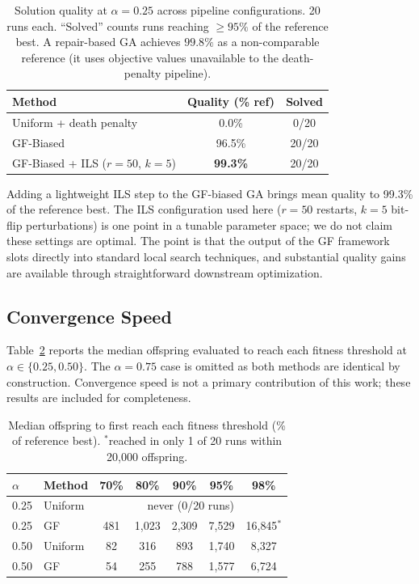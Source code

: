 \documentclass[twocolumn]{article}
\begin{document}
\begin{table}[H]
\centering
\begin{tabular}{p{4.0cm}cc}
\toprule
Method & Quality (\% ref) & Solved \\
\midrule
Uniform + death penalty & 0.0\% & 0/20 \\
GF-Biased & 96.5\% & 20/20 \\
GF-Biased + ILS ($r=50$, $k=5$) & \textbf{99.3\%} & 20/20 \\
\bottomrule
\end{tabular}
\caption{Solution quality at $\alpha = 0.25$ across pipeline 
configurations. 20 runs each. ``Solved'' counts runs reaching 
$\geq 95\%$ of the reference best. A repair-based GA achieves 
$99.8\%$ as a non-comparable reference (it uses objective values 
unavailable to the death-penalty pipeline).}
\label{tab:pipeline}
\end{table}

Adding a lightweight ILS step to the GF-biased GA brings mean quality 
to 99.3\% of the reference best. The ILS configuration used here 
($r = 50$ restarts, $k = 5$ bit-flip perturbations) is one point in a 
tunable parameter space; we do not claim these settings are optimal. 
The point is that the output of the GF framework slots directly into 
standard local search techniques, and substantial quality gains are 
available through straightforward downstream optimization.

\subsection{Convergence Speed}
\label{sec:convergence}

Table~\ref{tab:convergence} reports the median offspring evaluated to 
reach each fitness threshold at $\alpha \in \{0.25, 0.50\}$. The 
$\alpha = 0.75$ case is omitted as both methods are identical by 
construction. Convergence speed is not a primary contribution of this 
work; these results are included for completeness.

\begin{table}[H]
\centering
\small
\begin{tabular}{llccccc}
\toprule
$\alpha$ & Method & 70\% & 80\% & 90\% & 95\% & 98\% \\
\midrule
0.25 & Uniform  & \multicolumn{5}{c}{never (0/20 runs)} \\
0.25 & GF & 481 & 1{,}023 & 2{,}309 & 7{,}529 & 16{,}845$^*$ \\
\midrule
0.50 & Uniform  & 82 & 316 & 893 & 1{,}740 & 8{,}327 \\
0.50 & GF & 54 & 255 & 788 & 1{,}577 & 6{,}724 \\
\bottomrule
\end{tabular}
\caption{Median offspring to first reach each fitness threshold 
(\% of reference best). $^*$reached in only 1 of 20 runs within 
20,000 offspring.}
\label{tab:convergence}
\end{table}
\end{document}
